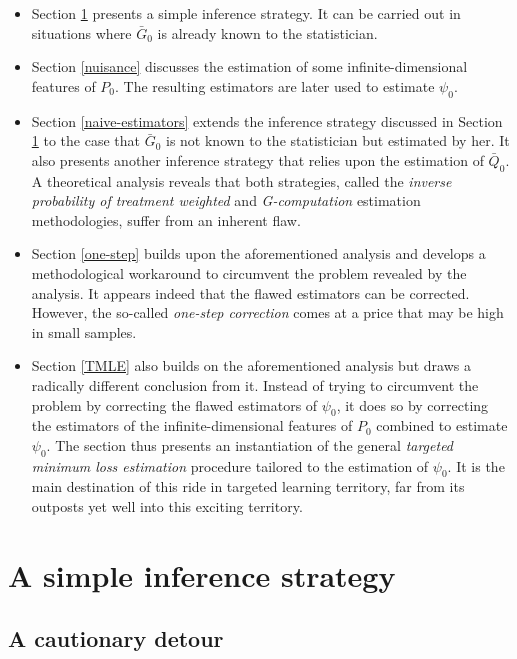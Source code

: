 \documentclass[11pt,openright,twoside]{book}
\newcommand{\Gbar}{\bar{G}}
\newcommand{\Qbar}{\bar{Q}}
\theoremstyle{definition}
\theoremstyle{definition}
\theoremstyle{definition}
\theoremstyle{remark}
\begin{document}
\begin{itemize}
\item
  Section \ref{simple-strategy} presents a simple inference strategy. It can
  be carried out in situations where \(\Gbar_{0}\) is already known to the
  statistician.
\item
  Section \ref{nuisance} discusses the estimation of some
  infinite-dimensional features of \(P_{0}\). The resulting estimators are
  later used to estimate \(\psi_{0}\).
\item
  Section \ref{naive-estimators} extends the inference strategy discussed in
  Section \ref{simple-strategy} to the case that \(\Gbar_{0}\) is not known to
  the statistician but estimated by her. It also presents another inference
  strategy that relies upon the estimation of \(\Qbar_{0}\). A theoretical
  analysis reveals that both strategies, called the \emph{inverse probability of
  treatment weighted} and \emph{G-computation} estimation methodologies, suffer
  from an inherent flaw.
\item
  Section \ref{one-step} builds upon the aforementioned analysis and develops
  a methodological workaround to circumvent the problem revealed by the
  analysis. It appears indeed that the flawed estimators can be
  corrected. However, the so-called \emph{one-step correction} comes at a price
  that may be high in small samples.
\item
  Section \ref{TMLE} also builds on the aforementioned analysis but draws a
  radically different conclusion from it. Instead of trying to circumvent the
  problem by correcting the flawed estimators of \(\psi_{0}\), it does so by
  correcting the estimators of the infinite-dimensional features of \(P_{0}\)
  combined to estimate \(\psi_{0}\). The section thus presents an instantiation
  of the general \emph{targeted minimum loss estimation} procedure tailored to the
  estimation of \(\psi_{0}\). It is the main destination of this ride in
  targeted learning territory, far from its outposts yet well into this
  exciting territory.
\end{itemize}

\hypertarget{simple-strategy}{%
\chapter{A simple inference strategy}\label{simple-strategy}}

\hypertarget{a-cautionary-detour}{%
\section{A cautionary detour}\label{a-cautionary-detour}}
\end{document}
